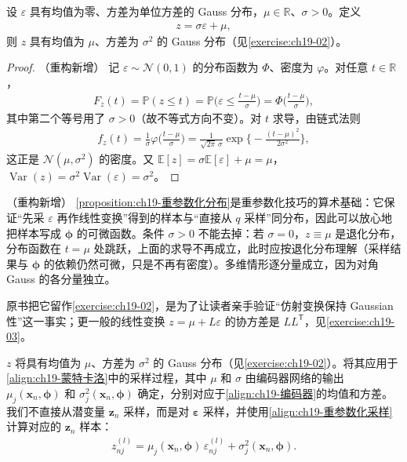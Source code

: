\documentclass[../../main.tex]{subfiles}
\begin{document}
\begin{proposition}[重参数化采样的分布]\label{proposition:ch19-重参数化分布}
设 $\varepsilon$ 具有均值为零、方差为单位方差的 Gauss 分布，$\mu\in\mathbb{R}$、$\sigma>0$。定义
\begin{align}
z=\sigma\varepsilon+\mu,
\label{align:ch19-重参数化采样}
\end{align}
则 $z$ 具有均值为 $\mu$、方差为 $\sigma^{2}$ 的 Gauss 分布（见\cref{exercise:ch19-02}）。
\end{proposition}
\begin{proof}（重构新增）
记 $\varepsilon\sim\mathcal{N}(0,1)$ 的分布函数为 $\Phi$、密度为 $\varphi$。对任意 $t\in\mathbb{R}$，
\begin{align*}
F_z(t)=\mathbb{P}(z\leqslant t)=\mathbb{P}\Big(\varepsilon\leqslant\frac{t-\mu}{\sigma}\Big)=\Phi\Big(\frac{t-\mu}{\sigma}\Big),
\end{align*}
其中第二个等号用了 $\sigma>0$（故不等式方向不变）。对 $t$ 求导，由链式法则
\begin{align*}
f_z(t)=\frac{1}{\sigma}\varphi\Big(\frac{t-\mu}{\sigma}\Big)=\frac{1}{\sqrt{2\pi}\,\sigma}\exp\Big\{-\frac{(t-\mu)^{2}}{2\sigma^{2}}\Big\},
\end{align*}
这正是 $\mathcal{N}(\mu,\sigma^{2})$ 的密度。又 $\mathbb{E}[z]=\sigma\mathbb{E}[\varepsilon]+\mu=\mu$，$\operatorname{Var}(z)=\sigma^{2}\operatorname{Var}(\varepsilon)=\sigma^{2}$。
\end{proof}

\begin{remark}（重构新增）
\cref{proposition:ch19-重参数化分布}是重参数化技巧的算术基础：它保证“先采 $\varepsilon$ 再作线性变换”得到的样本与“直接从 $q$ 采样”同分布，因此可以放心地把样本写成 $\bm{\phi}$ 的可微函数。条件 $\sigma>0$ 不能去掉：若 $\sigma=0$，$z\equiv\mu$ 是退化分布，分布函数在 $t=\mu$ 处跳跃，上面的求导不再成立，此时应按退化分布理解（采样结果与 $\bm{\phi}$ 的依赖仍然可微，只是不再有密度）。多维情形逐分量成立，因为对角 Gauss 的各分量独立。

原书把它留作\cref{exercise:ch19-02}，是为了让读者亲手验证“仿射变换保持 Gaussian 性”这一事实；更一般的线性变换 $z=\mu+L\varepsilon$ 的协方差是 $LL^{\mathsf T}$，见\cref{exercise:ch19-03}。
\end{remark}

$z$ 将具有均值为 $\mu$、方差为 $\sigma^{2}$ 的 Gauss 分布（见\cref{exercise:ch19-02}）。将其应用于\eqref{align:ch19-蒙特卡洛}中的采样过程，其中 $\mu$ 和 $\sigma$ 由编码器网络的输出 $\mu_j(\bm{x}_n,\bm{\phi})$ 和 $\sigma_j^{2}(\bm{x}_n,\bm{\phi})$ 确定，分别对应于\eqref{align:ch19-编码器}的均值和方差。我们不直接从潜变量 $\bm{z}_n$ 采样，而是对 $\bm{\varepsilon}$ 采样，并使用\eqref{align:ch19-重参数化采样}计算对应的 $\bm{z}_n$ 样本：
\begin{align}
z_{nj}^{(l)}=\mu_j(\bm{x}_n,\bm{\phi})\,\varepsilon_{nj}^{(l)}+\sigma_j^{2}(\bm{x}_n,\bm{\phi}).
\label{align:ch19-重参数化样本}
\end{align}
\end{document}
